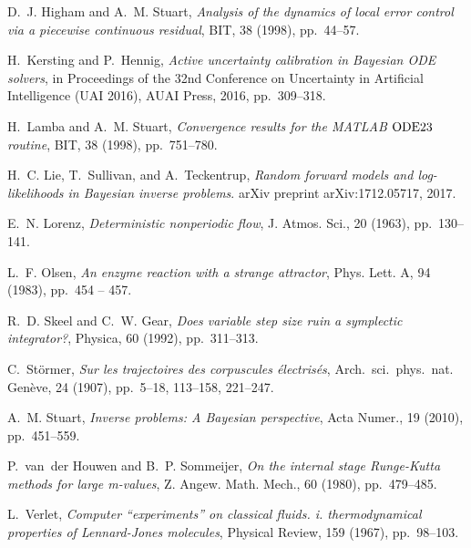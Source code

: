 \documentclass[10pt]{article}
\begin{document}
\begin{thebibliography}{10}
	{\sc D.~J. Higham and A.~M. Stuart}, {\em Analysis of the dynamics of local
		error control via a piecewise continuous residual}, BIT, 38 (1998),
	pp.~44--57.
	
	{\sc H.~Kersting and P.~Hennig}, {\em Active uncertainty calibration in
		{B}ayesian {ODE} solvers}, in Proceedings of the 32nd Conference on
	Uncertainty in Artificial Intelligence (UAI 2016), {AUAI} Press, 2016,
	pp.~309--318.
	
	{\sc H.~Lamba and A.~M. Stuart}, {\em Convergence results for the {MATLAB}
		{${\rm ODE}23$} routine}, BIT, 38 (1998), pp.~751--780.
	
	{\sc H.~C. Lie, T.~Sullivan, and A.~Teckentrup}, {\em Random forward models and
		log-likelihoods in {B}ayesian inverse problems}.
	\newblock arXiv preprint arXiv:1712.05717, 2017.
	
	{\sc E.~N. Lorenz}, {\em Deterministic nonperiodic flow}, J. Atmos. Sci., 20
	(1963), pp.~130--141.
	
	{\sc L.~F. Olsen}, {\em An enzyme reaction with a strange attractor}, Phys.
	Lett. A, 94 (1983), pp.~454 -- 457.
	
	{\sc R.~D. Skeel and C.~W. Gear}, {\em Does variable step size ruin a
		symplectic integrator?}, Physica, 60 (1992), pp.~311--313.
	
	{\sc C.~St\"ormer}, {\em Sur les trajectoires des corpuscules \'electris\'es},
	Arch.\ sci.\ phys.\ nat. Gen\`eve, 24 (1907), pp.~5--18, 113--158, 221--247.
	
	{\sc A.~M. Stuart}, {\em Inverse problems: A {B}ayesian perspective}, Acta
	Numer., 19 (2010), pp.~451--559.
	
	{\sc P.~van~der Houwen and B.~P. Sommeijer}, {\em On the internal stage
		{R}unge-{K}utta methods for large m-values}, Z. Angew. Math. Mech., 60
	(1980), pp.~479--485.
	
	{\sc L.~Verlet}, {\em Computer ``experiments'' on classical fluids. i.
		thermodynamical properties of {L}ennard-{J}ones molecules}, Physical Review,
	159 (1967), pp.~98--103.
	
\end{thebibliography}
\end{document}
